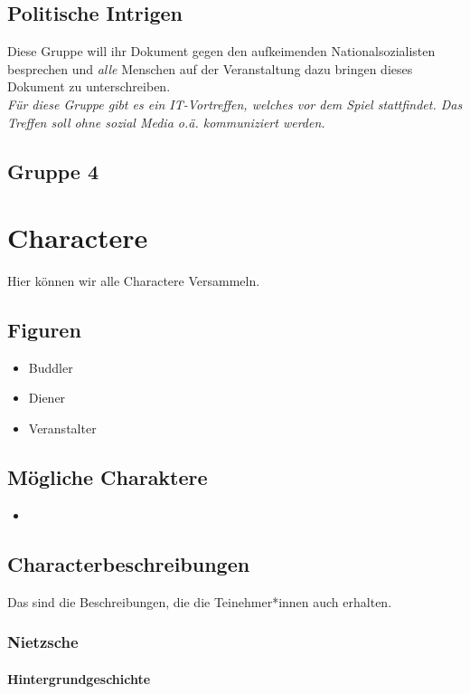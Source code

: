 \documentclass[12pt, a4paper, openany]{report}
\begin{document}
\section{Politische Intrigen}
Diese Gruppe will ihr Dokument gegen den aufkeimenden Nationalsozialisten besprechen und \emph{alle} Menschen auf der Veranstaltung dazu bringen dieses Dokument zu unterschreiben.\\

\emph{Für diese Gruppe gibt es ein IT-Vortreffen, welches vor dem Spiel stattfindet.
Das Treffen soll ohne sozial Media o.ä. kommuniziert werden.}

\section{Gruppe 4}

\chapter{Charactere}
Hier können wir alle Charactere Versammeln.

\section{Figuren}
\begin{itemize}
    \item Buddler
    \item Diener
    \item Veranstalter
\end{itemize}

\section{Mögliche Charaktere}
\begin{itemize}
    \item 
\end{itemize}
\section{Characterbeschreibungen}
Das sind die Beschreibungen, die die Teinehmer*innen auch erhalten.

\subsection{Nietzsche}
\subsubsection{Hintergrundgeschichte}
\end{document}
